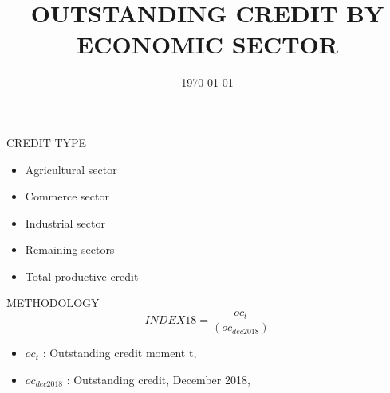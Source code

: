 \documentclass{beamer}
\title[Credit Type]{OUTSTANDING CREDIT BY ECONOMIC SECTOR}
\date{\today}
\begin{document}
	\begin{frame}
		\begin{center}
		\end{center}
	\end{frame}

\begin{frame}
    CREDIT TYPE
    \begin{multicols}{2}
	\begin{itemize}
		\item Agricultural sector
		\item Commerce sector
		\item Industrial sector
		\item Remaining sectors
		\item Total productive credit
	\end{itemize}
\end{multicols}	
\end{frame}
%
\begin{frame}
	METHODOLOGY
	\begin{equation}
	INDEX18=\frac{oc_{t}}{(oc_{dec2018})}
	\end{equation}
	{\footnotesize
		\begin{itemize}
			\item $oc_{t}$ : Outstanding credit moment t,
			\item $oc_{dec2018}$ : Outstanding credit, December 2018,
	\end{itemize}}
\end{frame}
\end{document}
